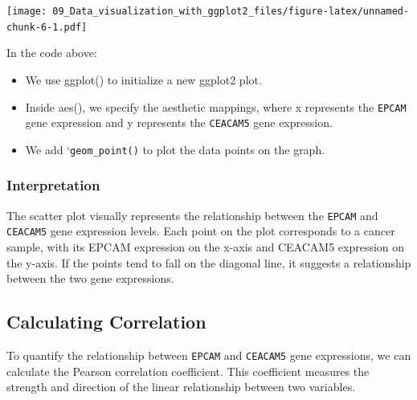 \documentclass[
]{book}
\newenvironment{Shaded}{\begin{snugshade}}{\end{snugshade}}
\newcommand{\CommentTok}[1]{\textcolor[rgb]{0.56,0.35,0.01}{\textit{#1}}}
\newcommand{\FunctionTok}[1]{\textcolor[rgb]{0.13,0.29,0.53}{\textbf{#1}}}
\newcommand{\NormalTok}[1]{#1}
\newcommand{\OtherTok}[1]{\textcolor[rgb]{0.56,0.35,0.01}{#1}}
\newcommand{\SpecialCharTok}[1]{\textcolor[rgb]{0.81,0.36,0.00}{\textbf{#1}}}
\begin{document}
\texttt{[image: 09\_Data\_visualization\_with\_ggplot2\_files/figure-latex/unnamed-chunk-6-1.pdf]}

In the code above:

\begin{itemize}
\item
  We use ggplot() to initialize a new ggplot2 plot.
\item
  Inside aes(), we specify the aesthetic mappings, where x represents the \texttt{EPCAM} gene expression and y represents the \texttt{CEACAM5} gene expression.
\item
  We add `\texttt{geom\_point()} to plot the data points on the graph.
\end{itemize}

\hypertarget{interpretation}{%
\subsubsection{Interpretation}\label{interpretation}}

The scatter plot visually represents the relationship between the \texttt{EPCAM} and \texttt{CEACAM5} gene expression levels. Each point on the plot corresponds to a cancer sample, with its EPCAM expression on the x-axis and CEACAM5 expression on the y-axis. If the points tend to fall on the diagonal line, it suggests a relationship between the two gene expressions.

\hypertarget{calculating-correlation}{%
\subsection{Calculating Correlation}\label{calculating-correlation}}

To quantify the relationship between \texttt{EPCAM} and \texttt{CEACAM5} gene expressions, we can calculate the Pearson correlation coefficient. This coefficient measures the strength and direction of the linear relationship between two variables.

\begin{Shaded}
\end{Shaded}
\end{document}
